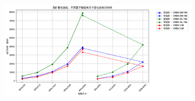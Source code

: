 \begin{figure}[htbp]
    \centering
    \includegraphics[width=0.9\textwidth]{figures/Exp3-2.png}
	\label{EXP3-2} %
\end{figure}
